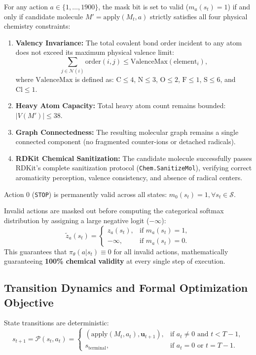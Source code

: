 \documentclass{ieeeaccess}
\begin{document}
For any action $a \in \{1, \dots, 1900\}$, the mask bit is set to valid ($m_a(s_t) = 1$) if and only if candidate molecule $M' = \text{apply}(M_t, a)$ strictly satisfies all four physical chemistry constraints:
\begin{enumerate}
    \item \textbf{Valency Invariance:} The total covalent bond order incident to any atom does not exceed its maximum physical valence limit:
    \begin{equation}
    \sum_{j \in \mathcal{N}(i)} \text{order}(i, j) \le \text{ValenceMax}(\text{element}_i),
    \label{eq:valency}
    \end{equation}
    where $\text{ValenceMax}$ is defined as: $\text{C} \le 4$, $\text{N} \le 3$, $\text{O} \le 2$, $\text{F} \le 1$, $\text{S} \le 6$, and $\text{Cl} \le 1$.
    \item \textbf{Heavy Atom Capacity:} Total heavy atom count remains bounded: $|V(M')| \le 38$.
    \item \textbf{Graph Connectedness:} The resulting molecular graph remains a single connected component (no fragmented counter-ions or detached radicals).
    \item \textbf{RDKit Chemical Sanitization:} The candidate molecule successfully passes RDKit's complete sanitization protocol (\texttt{Chem.SanitizeMol}), verifying correct aromaticity perception, valence consistency, and absence of radical centers.
\end{enumerate}

Action 0 (\texttt{STOP}) is permanently valid across all states: $m_0(s_t) = 1, \forall s_t \in \mathcal{S}$. 

Invalid actions are masked out before computing the categorical softmax distribution by assigning a large negative logit ($-\infty$):
\begin{equation}
\tilde{z}_a(s_t) = \begin{cases}
z_a(s_t), & \text{if } m_a(s_t) = 1, \\
-\infty, & \text{if } m_a(s_t) = 0.
\end{cases}
\label{eq:action_mask_logit}
\end{equation}
This guarantees that $\pi_\theta(a | s_t) \equiv 0$ for all invalid actions, mathematically guaranteeing \textbf{100\% chemical validity} at every single step of execution.

\subsection{Transition Dynamics and Formal Optimization Objective}
State transitions are deterministic:
\begin{equation}
s_{t+1} = \mathcal{P}(s_t, a_t) = \begin{cases}
(\text{apply}(M_t, a_t), \mathbf{u}_{t+1}), & \text{if } a_t \ne 0 \text{ and } t < T-1, \\
s_{\text{terminal}}, & \text{if } a_t = 0 \text{ or } t = T-1.
\end{cases}
\label{eq:transition}
\end{equation}
\end{document}
